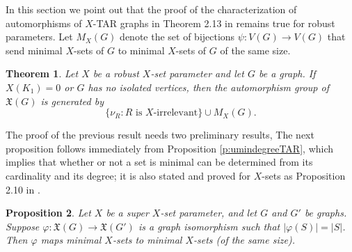 \documentclass{article}
\def\blu{\color{blue}}
\numberwithin{figure}{section}
\numberwithin{table}{section}
\numberwithin{equation}{section}
\newtheorem{thm}{Theorem}[section]
\newtheorem{prop}[thm]{Proposition}
\theoremstyle{definition}
\theoremstyle{definition}
\theoremstyle{definition}
\newcommand{\bpf}{\begin{proof}}
\newcommand{\epf}{\end{proof}\ms}
\newcommand{\ms}{\medskip}
\newcommand{\Xr}{X}
\newcommand{\xtar}{\mathfrak{X}}%
\newcommand{\xrtar}{\mathfrak{X}}%
\begin{document}
{In this section we point out that the proof of the characterization of automorphisms of $X$-TAR graphs in Theorem 2.13 in \cite{XTARiso}  remains true for robust parameters. 
 Let $M_{\Xr}(G)$ denote the set of bijections 
 $\psi:V(G)\to V(G)$ that send minimal $\Xr$-sets of $G$ to minimal $\Xr$-sets of $G$ of the same size.

\begin{thm}\label{t:auto-univ}
Let $\Xr$ be a robust $X$-set parameter and let $G$ be a graph.  If $X(K_1)=0$ or $G$ has no isolated vertices, then the automorphism group of $\xrtar(G)$ is generated by
\[
\{\nu_R : R\text{ is $\Xr$-irrelevant}\}\cup M_{\Xr}(G).
\]
\end{thm}
 The proof of the previous result needs two preliminary results, %
 The next proposition  follows immediately from  Proposition \ref{p:umindegreeTAR}, which implies that whether or not a set is minimal can be determined from its cardinality and its degree; it is also  stated and proved for $X$-sets as Proposition 2.10 in \cite{XTARiso}.

\begin{prop}\label{minimal-u} Let $X$ be a super $X$-set parameter, and let $G$ and $G'$ be graphs. %
 Suppose $\varphi:\xrtar(G)\to \xrtar(G')$ is a graph isomorphism  such that $|\varphi(S)|=|S|$. Then $\varphi$ maps minimal $X$-sets to minimal $X$-sets (of the same size).
\end{prop}

}
\end{document}
